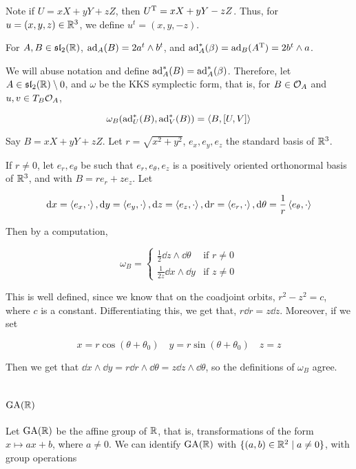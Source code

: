 \documentclass{article}
\renewcommand{\sl}{\mfs\mfl}
\DeclareMathOperator{\GA}{GA}
\begin{document}
Note if \(U = xX + yY + zZ\), then \(U^{\mathrm{T}} = xX + yY - zZ\). Thus, for \(u= (x, y, z) \in \mathbb{R}^3\), we define \(u^t = (x, y, -z)\).

\begin{lemma}
    For \(A, B \in \sl_2(\R)\), \(\operatorname{ad}_A(B) = 2a^t \wedge b^t\), and \(\operatorname{ad}_A^*(\beta) = \operatorname{ad}_B(A^{\mathrm{T}}) = 2b^t \wedge a\).
\end{lemma}

We will abuse notation and define \(\operatorname{ad}_A^*(B) = \operatorname{ad}_A^*(\beta)\). Therefore, let \(A \in \sl_2(\R) \setminus 0\), and \(\omega\) be the KKS symplectic form, that is, for \(B \in \mathcal{O}_A\) and \(u, v \in T_B\mathcal{O}_A\),

\[\omega_B(\operatorname{ad}_U^*(B), \operatorname{ad}_V^*(B)) = \left\langle B, [U, V] \right\rangle\]

Say \(B = xX + yY + zZ\). Let \(r = \sqrt{x^2 + y^2}\), \(e_x, e_y, e_z\) the standard basis of \(\mathbb{R}^3\).

If \(r \ne 0\), let \(e_r, e_\theta\) be such that \(e_r, e_\theta, e_z\) is a positively oriented orthonormal basis of \(\mathbb{R}^3\), and with \(B = re_r + ze_z\). Let

\[\dd x = \left\langle e_x, \cdot \right\rangle, \dd y = \left\langle e_y, \cdot \right\rangle, \dd z = \left\langle e_z, \cdot \right\rangle, \dd r = \left\langle e_r, \cdot \right\rangle, \dd\theta = \frac{1}{r}\left\langle e_\theta, \cdot \right\rangle\]

Then by a computation,

\[\omega_B = \begin{cases}
    \frac{1}{2}\dd z \wedge \dd\theta & \text{if }r \ne 0 \\
    \frac{1}{2z} \dd x \wedge \dd y & \text{if }z \ne 0
\end{cases}\]

This is well defined, since we know that on the coadjoint orbits, \(r^2 - z^2 = c\), where \(c\) is a constant. Differentiating this, we get that, \(r\dd r = z \dd z\). Moreover, if we set

\[x= r \cos(\theta + \theta_0) \quad y = r \sin(\theta + \theta_0) \quad z = z\]

Then we get that \(\dd x \wedge \dd y = r \dd r \wedge \dd\theta = z \dd z \wedge \dd\theta\), so the definitions of \(\omega_B\) agree.

\section{\(\GA(\R)\)}

Let \(\GA(\R)\) be the affine group of \(\mathbb{R}\), that is, transformations of the form \(x \mapsto ax + b\), where \(a \ne 0\). We can identify \(\GA(\R)\) with \(\{(a, b) \in \mathbb{R}^2 \mid a \ne 0\}\), with group operations
\end{document}
